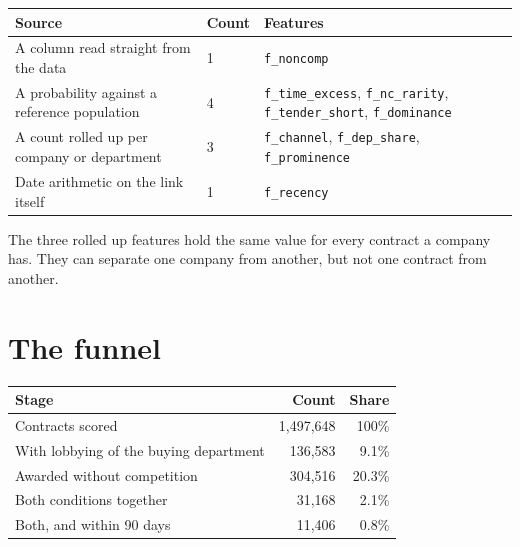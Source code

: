 \documentclass[11pt,a4paper]{article}
\begin{document}
\begin{center}\small
\begin{tabular}{@{}p{5.4cm}p{1.4cm}p{7.6cm}@{}}
\toprule
\textbf{Source} & \textbf{Count} & \textbf{Features} \\
\midrule
A column read straight from the data & 1 &
  \texttt{f\_noncomp} \\
A probability against a reference population & 4 &
  \texttt{f\_time\_excess}, \texttt{f\_nc\_rarity}, \texttt{f\_tender\_short},
  \texttt{f\_dominance} \\
A count rolled up per company or department & 3 &
  \texttt{f\_channel}, \texttt{f\_dep\_share}, \texttt{f\_prominence} \\
Date arithmetic on the link itself & 1 &
  \texttt{f\_recency} \\
\bottomrule
\end{tabular}
\end{center}

The three rolled up features hold the same value for every contract a company has. They
can separate one company from another, but not one contract from another.

\section*{The funnel}

\begin{center}\small
\begin{tabular}{@{}lrr@{}}
\toprule
\textbf{Stage} & \textbf{Count} & \textbf{Share} \\
\midrule
Contracts scored                        & 1{,}497{,}648 & 100\% \\
With lobbying of the buying department  &   136{,}583 &  9.1\% \\
Awarded without competition             &   304{,}516 & 20.3\% \\
Both conditions together                &    31{,}168 &  2.1\% \\
Both, and within 90 days                &    11{,}406 &  0.8\% \\
\bottomrule
\end{tabular}
\end{center}
\end{document}
